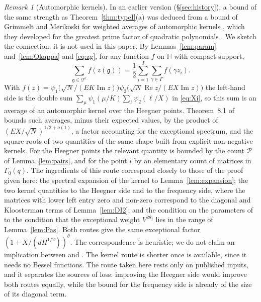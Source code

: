 \documentclass[11pt]{amsart}
\theoremstyle{remark}
\newtheorem{remark}[theorem]{Remark}
\theoremstyle{definition}
\numberwithin{equation}{section}
\newcommand{\Qc}{\mathcal{Q}}
\newcommand{\Pc}{\mathcal{P}}
\newcommand{\Hb}{\mathbb{H}}
\newcommand{\fg}{\mathfrak{g}}
\begin{document}
\begin{remark}[Automorphic kernels]\label{rem:GM}
In an earlier version (\S\ref{sec:history}), a bound of the same strength as Theorem~\ref{thm:typeI}(a) was deduced from a bound of Grimmelt and Merikoski for weighted averages of automorphic kernels \cite[Theorem~8.1]{GM1}, which they developed for the greatest prime factor of quadratic polynomials \cite{GM2}. We sketch the connection; it is not used in this paper. By Lemmas~\ref{lem:param} and~\ref{lem:Qkappa} and \eqref{eq:zg}, for any function $f$ on $\Hb$ with compact support,
\[
\sum_{\fg\in\Qc^\kappa}f(z(\fg))=\frac12\sum_{i=1}^I\sum_{\gamma\in\Gamma}f(\gamma z_i).
\]
With $f(z)=\psi_1\bigl(\sqrt N/(EK\operatorname{Im}z)\bigr)\psi_2\bigl(\sqrt N\operatorname{Re}z/(EX\operatorname{Im}z)\bigr)$ the left-hand side is the double sum $\sum_\mu\psi_1(\mu/K)\sum_\ell\psi_2(\ell/X)$ in \eqref{eq:Xi}, so this sum is an average of an automorphic kernel over the Heegner points. Theorem~8.1 of \cite{GM1} bounds such averages, minus their expected values, by the product of $(EX/\sqrt N)^{1/2+o(1)}$, a factor accounting for the exceptional spectrum, and the square roots of two quantities of the same shape built from explicit non-negative kernels. For the Heegner points the relevant quantity is bounded by the count $\Pc$ of Lemma~\ref{lem:pairs}, and for the point $i$ by an elementary count of matrices in $\Gamma_0(q)$. The ingredients of this route correspond closely to those of the proof given here: the spectral expansion of the kernel to Lemma~\ref{lem:expansion}; the two kernel quantities to the Heegner side and to the frequency side, where the matrices with lower left entry zero and non-zero correspond to the diagonal and Kloosterman terms of Lemma~\ref{lem:DI2}; and the condition on the parameters of \cite[Theorem~8.1]{GM1} to the condition that the exceptional weight $V^{2\theta_j}$ lies in the range of Lemma~\ref{lem:Pas}. Both routes give the same exceptional factor $(1+X/(dH^{1/2}))^\theta$. The correspondence is heuristic; we do not claim an implication between \cite[Theorem~8.1]{GM1} and \cite[Theorem~2]{Pas}. The kernel route is shorter once \cite[Theorem~8.1]{GM1} is available, since it needs no Bessel functions. The route taken here rests only on published inputs, and it separates the sources of loss: improving the Heegner side would improve both routes equally, while the bound for the frequency side is already of the size of its diagonal term.
\end{remark}
\end{document}
